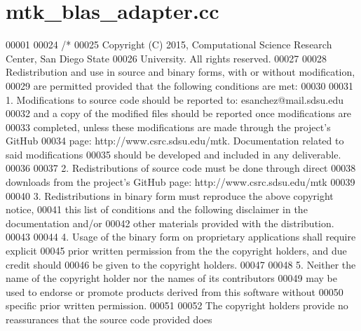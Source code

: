 \hypertarget{mtk__blas__adapter_8cc_source}{\section{mtk\+\_\+blas\+\_\+adapter.\+cc}
\label{mtk__blas__adapter_8cc_source}
}

\begin{DoxyCode}
00001 
00024 \textcolor{comment}{/*}
00025 \textcolor{comment}{Copyright (C) 2015, Computational Science Research Center, San Diego State}
00026 \textcolor{comment}{University. All rights reserved.}
00027 \textcolor{comment}{}
00028 \textcolor{comment}{Redistribution and use in source and binary forms, with or without modification,}
00029 \textcolor{comment}{are permitted provided that the following conditions are met:}
00030 \textcolor{comment}{}
00031 \textcolor{comment}{1. Modifications to source code should be reported to: esanchez@mail.sdsu.edu}
00032 \textcolor{comment}{and a copy of the modified files should be reported once modifications are}
00033 \textcolor{comment}{completed, unless these modifications are made through the project's GitHub}
00034 \textcolor{comment}{page: http://www.csrc.sdsu.edu/mtk. Documentation related to said modifications}
00035 \textcolor{comment}{should be developed and included in any deliverable.}
00036 \textcolor{comment}{}
00037 \textcolor{comment}{2. Redistributions of source code must be done through direct}
00038 \textcolor{comment}{downloads from the project's GitHub page: http://www.csrc.sdsu.edu/mtk}
00039 \textcolor{comment}{}
00040 \textcolor{comment}{3. Redistributions in binary form must reproduce the above copyright notice,}
00041 \textcolor{comment}{this list of conditions and the following disclaimer in the documentation and/or}
00042 \textcolor{comment}{other materials provided with the distribution.}
00043 \textcolor{comment}{}
00044 \textcolor{comment}{4. Usage of the binary form on proprietary applications shall require explicit}
00045 \textcolor{comment}{prior written permission from the the copyright holders, and due credit should}
00046 \textcolor{comment}{be given to the copyright holders.}
00047 \textcolor{comment}{}
00048 \textcolor{comment}{5. Neither the name of the copyright holder nor the names of its contributors}
00049 \textcolor{comment}{may be used to endorse or promote products derived from this software without}
00050 \textcolor{comment}{specific prior written permission.}
00051 \textcolor{comment}{}
00052 \textcolor{comment}{The copyright holders provide no reassurances that the source code provided does}

\end{DoxyCode}
